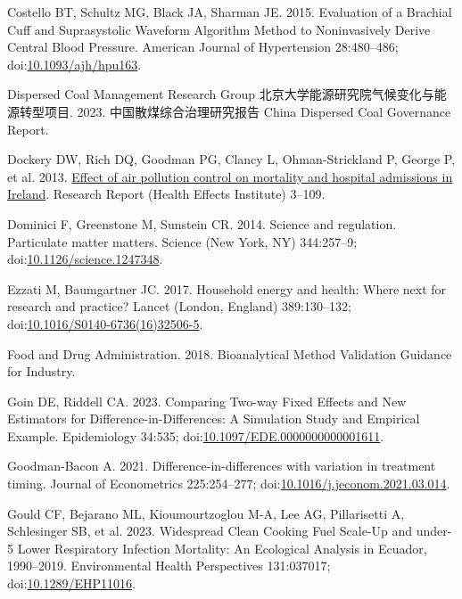 \documentclass[
  letterpaper,
  DIV=11,
  numbers=noendperiod]{scrartcl}
\newlength{\cslhangindent}
\newlength{\cslentryspacingunit} %
\newenvironment{CSLReferences}[2] %
 {%
  \setlength{\parindent}{0pt}
  \ifodd #1
  \let\oldpar\par
  \def\par{\hangindent=\cslhangindent\oldpar}
  \fi
  \setlength{\parskip}{#2\cslentryspacingunit}
 }%
 {}
\begin{document}
\begin{CSLReferences}{1}{0}
\leavevmode{}%
Costello BT, Schultz MG, Black JA, Sharman JE. 2015. Evaluation of a
{Brachial Cuff} and {Suprasystolic Waveform Algorithm Method} to
{Noninvasively Derive Central Blood Pressure}. American Journal of
Hypertension 28:480--486;
doi:\href{https://doi.org/10.1093/ajh/hpu163}{10.1093/ajh/hpu163}.

\leavevmode{}%
Dispersed Coal Management Research Group
北京大学能源研究院气候变化与能源转型项目. 2023. 中国散煤综合治理研究报告
{China Dispersed Coal Governance Report}.

\leavevmode{}%
Dockery DW, Rich DQ, Goodman PG, Clancy L, Ohman-Strickland P, George P,
et al. 2013. \href{https://www.ncbi.nlm.nih.gov/pubmed/24024358}{Effect
of air pollution control on mortality and hospital admissions in
{Ireland}}. Research Report (Health Effects Institute) 3--109.

\leavevmode{}%
Dominici F, Greenstone M, Sunstein CR. 2014. Science and regulation.
{Particulate} matter matters. Science (New York, NY) 344:257--9;
doi:\href{https://doi.org/10.1126/science.1247348}{10.1126/science.1247348}.

\leavevmode{}%
Ezzati M, Baumgartner JC. 2017. Household energy and health: Where next
for research and practice? Lancet (London, England) 389:130--132;
doi:\href{https://doi.org/10.1016/S0140-6736(16)32506-5}{10.1016/S0140-6736(16)32506-5}.

\leavevmode{}%
Food and Drug Administration. 2018. Bioanalytical {Method Validation
Guidance} for {Industry}.

\leavevmode{}%
Goin DE, Riddell CA. 2023. Comparing {Two-way Fixed Effects} and {New
Estimators} for {Difference-in-Differences}: {A Simulation Study} and
{Empirical Example}. Epidemiology 34:535;
doi:\href{https://doi.org/10.1097/EDE.0000000000001611}{10.1097/EDE.0000000000001611}.

\leavevmode{}%
Goodman-Bacon A. 2021. Difference-in-differences with variation in
treatment timing. Journal of Econometrics 225:254--277;
doi:\href{https://doi.org/10.1016/j.jeconom.2021.03.014}{10.1016/j.jeconom.2021.03.014}.

\leavevmode{}%
Gould CF, Bejarano ML, Kioumourtzoglou M-A, Lee AG, Pillarisetti A,
Schlesinger SB, et al. 2023. Widespread {Clean Cooking Fuel Scale-Up}
and under-5 {Lower Respiratory Infection Mortality}: {An Ecological
Analysis} in {Ecuador}, 1990--2019. Environmental Health Perspectives
131:037017;
doi:\href{https://doi.org/10.1289/EHP11016}{10.1289/EHP11016}.


\end{CSLReferences}
\end{document}
